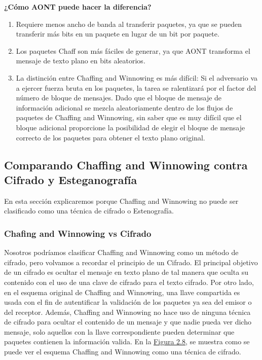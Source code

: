 \documentclass[12pt, a4paper, titlepage]{report}
\begin{document}
        \textbf{¿Cómo AONT puede hacer la diferencia?}\\
        \begin{enumerate}
            \item Requiere menos ancho de banda al transferir paquetes, ya que se pueden transferir más bits en un paquete en lugar de un bit por paquete.
            \item Los paquetes Chaff son más fáciles de generar, ya que AONT transforma el mensaje de texto plano en bits aleatorios.
            \item La distinción entre Chaffing and Winnowing es más difícil: Si el adversario va a ejercer fuerza bruta en los paquetes, la tarea se ralentizará por el factor del número de bloque de mensajes. Dado que el bloque de mensaje de información adicional se mezcla aleatoriamente dentro de los flujos de paquetes de Chaffing and Winnowing, sin saber que es muy difícil que el bloque adicional proporcione la posibilidad de elegir el bloque de mensaje correcto de los paquetes para obtener el texto plano original.
        \end{enumerate}
        
        \subsection{Comparando Chaffing and Winnowing contra Cifrado y Esteganograf\'ia}
        
        En esta sección explicaremos porque Chaffing and Winnowing no puede ser clasificado como una técnica de cifrado o Estenografía.\\
        
        \subsubsection{Chafing and Winnowing vs Cifrado}
        
        Nosotros podríamos clasificar Chaffing and Winnowing como un método de cifrado, pero volvamos a recordar el principio de un Cifrado.
        El principal objetivo de un cifrado es ocultar el mensaje en texto plano de tal manera que oculta su contenido con el uso de una clave de cifrado para el texto cifrado.
        Por otro lado, en el esquema original de Chaffing and Winnowing, una llave compartida es usada con el fin de autentificar la validación de los paquetes ya sea del emisor o del receptor. Además, Chaffing and Winnowing no hace uso de ninguna técnica de cifrado para ocultar el contenido de un mensaje y que nadie pueda ver dicho mensaje, solo aquellos con la llave correspondiente pueden determinar que paquetes contienen la información valida. En la \hyperref[C&W_AONT]{Figura 2.8}, se muestra como se puede ver el esquema Chaffing and Winnowing como una técnica de cifrado. \\
        
\end{document}
